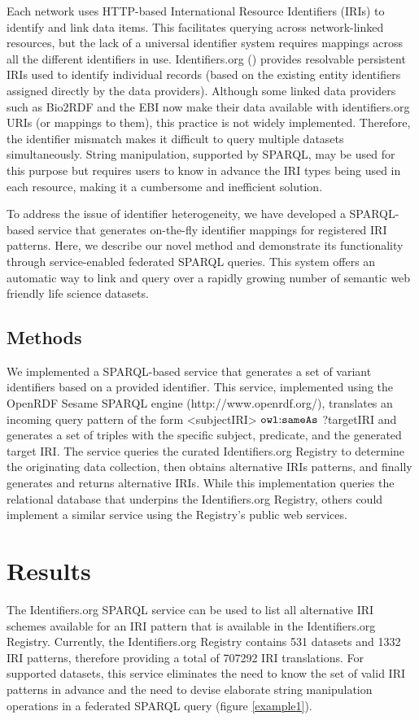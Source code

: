 \documentclass{bioinfo}
\begin{document}
Each network uses HTTP-based International Resource Identifiers (IRIs) to identify and link data items. This facilitates querying across network-linked resources, but the lack of a universal identifier system requires mappings across all the different identifiers in use. Identifiers.org (\cite{Juty01012012}) provides resolvable persistent IRIs used to identify individual records (based on the existing entity identifiers assigned directly by the data providers). Although some linked data providers such as Bio2RDF and the EBI now make their data available with identifiers.org URIs (or mappings to them), this practice is not widely implemented. Therefore, the identifier mismatch makes it difficult to query multiple datasets simultaneously.  String manipulation, supported by SPARQL, may be used for this purpose but requires users to know in advance the IRI types being used in each resource, making it a cumbersome and inefficient solution. 
 
To address the issue of identifier heterogeneity, we have developed a SPARQL-based service that generates on-the-fly identifier mappings for registered IRI patterns. Here, we describe our novel method and demonstrate its functionality through service-enabled federated SPARQL queries. This system offers an automatic way to link and query over a rapidly growing number of semantic web friendly life science datasets.

\begin{methods}
\section{Methods}
We implemented a SPARQL-based service that generates a set of variant identifiers based on a provided identifier. This service, implemented using the OpenRDF Sesame SPARQL engine (http://www.openrdf.org/), translates an incoming query pattern of the form <subjectIRI> $\mathtt{owl\text{\rm :}{}sameAs}$ ?targetIRI and generates a set of triples with the specific subject, predicate, and the generated target IRI. The service queries the curated Identifiers.org Registry to determine the originating data collection, then obtains alternative IRIs patterns, and finally generates and returns alternative IRIs. While this implementation queries the relational database that underpins the Identifiers.org Registry, others could implement a similar service using the Registry's public web services.
\end{methods}

\section{Results}
The Identifiers.org SPARQL service can be used to list all alternative IRI schemes available for an IRI pattern that is available in the Identifiers.org Registry. Currently, the Identifiers.org Registry contains 531 datasets and 1332 IRI patterns, therefore providing a total of 707292 IRI translations. For supported datasets, this service eliminates the need to know the set of valid IRI patterns in advance and the need to devise elaborate string manipulation operations in a federated SPARQL query (figure \ref{example1}).
\end{document}
